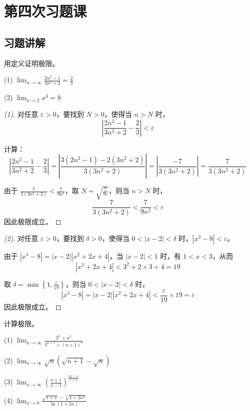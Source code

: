 \documentclass[lang=cn,12pt]{elegantbook}
\begin{document}
\chapter{第四次习题课}
\section{习题讲解}

\begin{example}
用定义证明极限。

(1) $\lim_{n \to \infty} \frac{2n^2-1}{3n^2+2} = \frac{2}{3}$

(2) $\lim_{x \to 2} x^3 = 8$
\end{example}

\begin{proof}[(1)]
对任意 $\varepsilon > 0$，要找到 $N > 0$，使得当 $n > N$ 时，
\[
\left|\frac{2n^2-1}{3n^2+2} - \frac{2}{3}\right| < \varepsilon
\]

计算：
\[
\left|\frac{2n^2-1}{3n^2+2} - \frac{2}{3}\right| = \left|\frac{3(2n^2-1) - 2(3n^2+2)}{3(3n^2+2)}\right| = \left|\frac{-7}{3(3n^2+2)}\right| = \frac{7}{3(3n^2+2)}
\]

由于 $\frac{7}{3(3n^2+2)} < \frac{7}{9n^2}$，取 $N = \sqrt{\frac{7}{9\varepsilon}}$，则当 $n > N$ 时，
\[
\frac{7}{3(3n^2+2)} < \frac{7}{9n^2} < \varepsilon
\]
因此极限成立。
\end{proof}

\begin{proof}[(2)]
对任意 $\varepsilon > 0$，要找到 $\delta > 0$，使得当 $0 < |x-2| < \delta$ 时，$|x^3 - 8| < \varepsilon$。

由于 $|x^3 - 8| = |x-2||x^2 + 2x + 4|$，当 $|x-2| < 1$ 时，有 $1 < x < 3$，从而
\[
|x^2 + 2x + 4| < 3^2 + 2 \times 3 + 4 = 19
\]

取 $\delta = \min\left\{1, \frac{\varepsilon}{19}\right\}$，则当 $0 < |x-2| < \delta$ 时，
\[
|x^3 - 8| = |x-2||x^2 + 2x + 4| < \frac{\varepsilon}{19} \times 19 = \varepsilon
\]
因此极限成立。
\end{proof}

\begin{example}
计算极限。

(1) $\lim_{n \to \infty} \frac{3^n+n^3}{3^{n+1}+(n+1)^3}$

(2) $\lim_{n \to \infty} \sqrt{n} (\sqrt{n+1} - \sqrt{n})$

(3) $\lim_{x \to \infty} \left(\frac{x+1}{x-1}\right)^{\frac{2x-1}{x+1}}$

(4) $\lim_{x \to 0} \frac{\sqrt{1+x} - \sqrt[3]{1+2x^2}}{\ln(1+3x)}$
\end{example}
\end{document}
